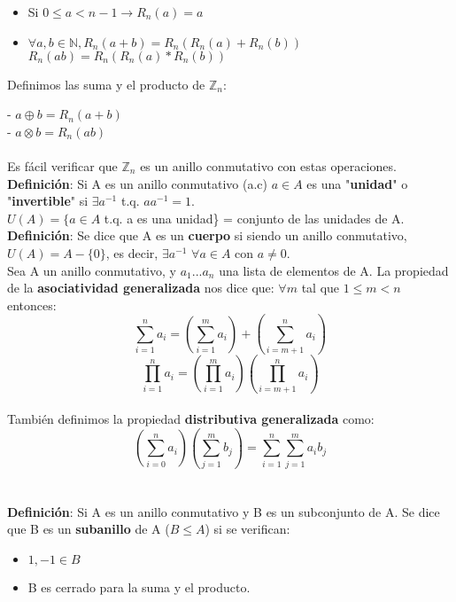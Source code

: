 \documentclass[11pt]{article}
\begin{document}
\begin{itemize}
\item Si $0 \leq a < n-1  \rightarrow R_n(a) = a$
\item $\forall a,b \in \mathbb{N}, R_n(a+b) = R_n(R_n(a) + R_n(b))$\\$R_n(ab) = R_n(R_n(a)*R_n(b))$

\end{itemize} 

Definimos las suma y el producto de $\mathbb{Z}_n$:

- $a\oplus b = R_n(a+b)$\\
\hspace*{0.6cm}- $a\otimes b = R_n(ab)$\\\\

Es fácil verificar que $\mathbb{Z}_n$ es un anillo conmutativo con estas operaciones.\\

\textbf{Definición}:
Si A es un anillo conmutativo (a.c) $a \in A$ es una "\textbf{unidad}" o "\textbf{invertible}" si $\exists a^{-1}$ t.q. $ aa^{-1} = 1$.\\ $U(A) = \{ a \in A$ t.q. a es una unidad\} = conjunto de las unidades de A.\\

\textbf{Definición}: Se dice que A es un \textbf{cuerpo} si siendo un anillo conmutativo, $U(A) = A - \{0\}$, es decir, $\exists a^{-1}$ $\forall a \in A$ con $a \neq 0$.\\

Sea A un anillo conmutativo, y $a_1 ... a_n$ una lista de elementos de A.
La propiedad de la \textbf{asociatividad generalizada} nos dice que:
$\forall m$ tal que $1 \leq m < n$ entonces: \[\sum_{i=1}^{n}a_i = (\sum_{i=1}^{m}a_i) + (\sum_{i=m+1}^{n}a_i)\]\[\prod_{i=1}^{n}a_i = (\prod_{i=1}^{m}a_i)(\prod_{i=m+1}^{n}a_i)\]\\

También definimos la propiedad \textbf{distributiva generalizada} como:\\

\[(\sum_{i=0}^{n} a_i)(\sum_{j=1}^{m}b_j) = \sum_{i=1}^{n}\sum_{j=1}^{m}a_i b_j\]\\\\

\textbf{Definición}:
Si A es un anillo conmutativo y B es un subconjunto de A. Se dice que B es un \textbf{subanillo} de A ($B \leq A$) si se verifican:
\begin{itemize}
\item $1,-1 \in B$
\item B es cerrado para la suma y el producto.
\end{itemize}
\end{document}
